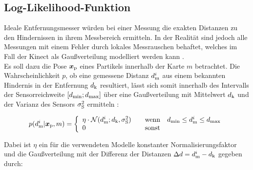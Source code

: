 
\subsection{Log-Likelihood-Funktion}
\label{chap.loglik}
Ideale Entfernungsmesser würden bei einer Messung die exakten Distanzen zu den Hindernissen in ihrem Messbereich ermitteln. In der Realität sind jedoch alle Messungen mit einem Fehler durch lokales Messrauschen behaftet, welches im Fall der Kinect als Gaußverteilung modelliert werden kann \cite{Nguyen2012}.\\

Es soll dazu die Pose $\mbox{\boldmath{$x$}}_{{\mathrm{p}}}$ eines Partikels innerhalb der Karte $m$ betrachtet. Die Wahrscheinlichkeit $p$, ob eine gemessene Distanz $d_{{\mathrm{m}}}^i$ aus einem bekannten Hindernis in der Entfernung $d_{{\mathrm{k}}}$ resultiert, lässt sich somit innerhalb des Intervalls der Sensorreichweite $[d_{{\mathrm{min}}};d_{{\mathrm{max}}}]$ über eine Gaußverteilung mit Mittelwert $d_{{\mathrm{k}}}$ und der Varianz des Sensors $\sigma_{{\mathrm{S}}}^2$ ermitteln \cite{Thrun2005}:

\begin{equation}
p(d_{\mathrm{m}}^i|\mbox{\boldmath{$x$}}_{{\mathrm{p}}},m) = \left\lbrace\begin{array}{ll}
\eta  \cdot \mathcal{N}(d_{{\mathrm{m}}}^i;d_{{\mathrm{k}}},\sigma_{{\mathrm{S}}}^2) & \quad \mathrm{wenn} \quad d_{{\mathrm{min}}}\leq d_{{\mathrm{m}}}^i \leq d_{{\mathrm{max}}} \\
0 & \quad \mathrm{sonst}
\end{array}
\right.
\end{equation}


Dabei ist $\eta$ ein für die verwendeten Modelle konstanter Normalisierungsfaktor und die Gaußverteilung mit der Differenz der Distanzen $\Delta d = d_{{\mathrm{m}}}^i-d_{{\mathrm{k}}}$  gegeben durch:

